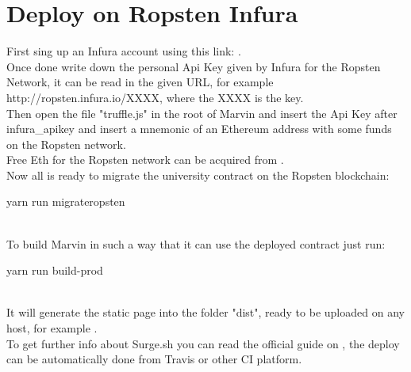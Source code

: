 \documentclass[ManualeSviluppatore.tex]{subfiles}
\begin{document}
\section{Deploy on Ropsten Infura}
First sing up an Infura account using this link: . \\
Once done write down the personal Api Key given by Infura for the Ropsten Network, it can be read in the given URL, for example http://ropsten.infura.io/XXXX, where the XXXX is the key. \\

Then open the file "truffle.js" in the root of Marvin and insert the Api Key after infura\_apikey and insert a mnemonic of an Ethereum address with some funds on the Ropsten network.\\
Free Eth for the Ropsten network can be acquired from .\\

Now all is ready to migrate the university contract on the Ropsten blockchain: \\
\begin{ttfamily} yarn run migrateropsten \end{ttfamily} \\

To build Marvin in such a way that it can use the deployed contract just run:  \\
\begin{ttfamily} yarn run build-prod \end{ttfamily} \\
It will generate the static page into the folder "dist", ready to be uploaded on any host, for example . \\

To get further info about Surge.sh you can read the official guide on , the deploy can be automatically done from Travis or other CI platform.
\end{document}
